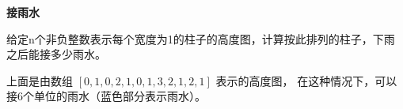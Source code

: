 \textbf{接雨水}\par

给定n个非负整数表示每个宽度为1的柱子的高度图，计算按此排列的柱子，下雨之后能接多少雨水。\par

上面是由数组 $ [0,1,0,2,1,0,1,3,2,1,2,1] $ 表示的高度图，
在这种情况下，可以接6个单位的雨水（蓝色部分表示雨水）。\par
